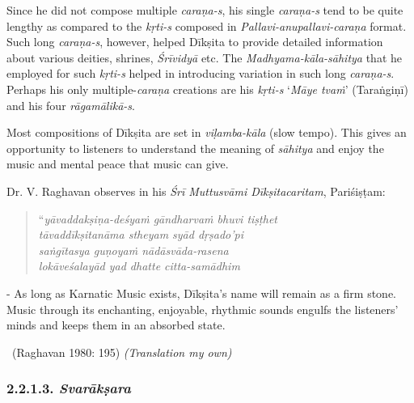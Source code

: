 Since he did not compose multiple \textit{caraṇa-s}, his single \textit{caraṇa-s} tend to be quite lengthy as compared to the \textit{kṛti-s} composed in \textit{Pallavi-anupallavi-caraṇa} format. Such long \textit{caraṇa-s}, however, helped Dīkṣita to provide detailed information about various deities, shrines, \textit{Śrīvidyā} etc. The \textit{Madhyama-kāla-sāhitya} that he employed for such \textit{kṛti-s} helped in introducing variation in such long \textit{caraṇa-s}. Perhaps his only multiple-\textit{caraṇa} creations are his \textit{kṛti-s} ‘\textit{Māye tvaṁ}’ (Taraṅgiṇī) and his four \textit{rāgamālikā-s}.

Most compositions of Dīkṣita are set in \textit{viḷamba-kāla} (slow tempo). This gives an opportunity to listeners to understand the meaning of \textit{sāhitya} and enjoy the music and mental peace that music can give.

Dr. V. Raghavan observes in his \textit{Śrī Muttusvāmi Dīkṣitacaritam}, Pariśiṣṭam:

\begin{verse}
“\textit{yāvaddakṣiṇa-deśyaṁ gāndharvaṁ bhuvi tiṣṭhet} \\ \textit{tāvaddīkṣitanāma stheyam syād dṛṣado'pi} \\ \textit{saṅgītasya guṇoyaṁ nādāsvāda-rasena} \\ \textit{lokāveśalayād yad dhatte citta-samādhim} 
\end{verse}

\begin{myquote}
- As long as Karnatic Music exists, Dīkṣita’s name will remain as a firm stone. Music through its enchanting, enjoyable, rhythmic sounds engulfs the listeners’ minds and keeps them in an absorbed state. 

~\hfill (Raghavan 1980: 195) \textit{(Translation my own)}
\end{myquote}


\subsubsection*{2.2.1.3. \textit{Svarākṣara}}

